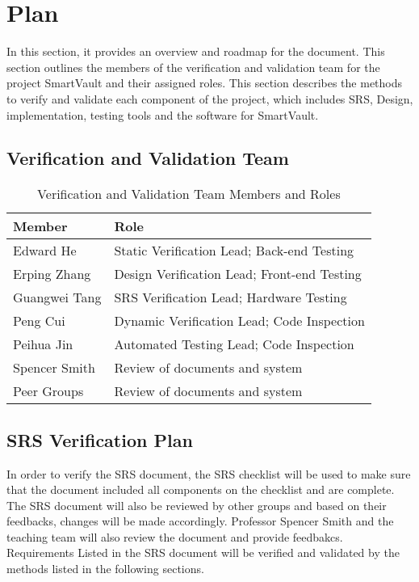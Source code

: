 \documentclass[12pt, titlepage]{article}
\begin{document}
\section{Plan}
In this section, it provides an overview and roadmap for the document. This section outlines the members of the verification and validation team for the project SmartVault and their assigned roles. This section describes the methods to verify and validate each component of the project, which includes SRS, Design, implementation, testing tools and the software for SmartVault.

\subsection{Verification and Validation Team}

\begin{table}[h]
\begin{center}
\begin{tabular}{|l | l|}
\hline
  \textbf{Member} & \textbf{Role}\\
  \hline
  Edward He & Static Verification Lead; Back-end Testing\\
  \hline
  Erping Zhang & Design Verification Lead; Front-end Testing \\
  \hline
  Guangwei Tang & SRS Verification Lead; Hardware Testing\\
  \hline
  Peng Cui & Dynamic Verification Lead; Code Inspection\\
  \hline
  Peihua Jin & Automated Testing Lead; Code Inspection\\
  \hline
  Spencer Smith & Review of documents and system\\
  \hline
  Peer Groups & Review of documents and system\\
  \hline
\end{tabular}
\end{center}
\caption{Verification and Validation Team Members and Roles}            

\end{table}
\break
\subsection{SRS Verification Plan}

In order to verify the SRS document, the SRS checklist will be used to make sure that the document included all components on the checklist and are complete. The SRS document will also be reviewed by other groups and based on their feedbacks, changes will be made accordingly. Professor Spencer Smith and the teaching team will also review the document and provide feedbakcs. Requirements Listed in the SRS document will be verified and validated by the methods listed in the following sections.
\end{document}
